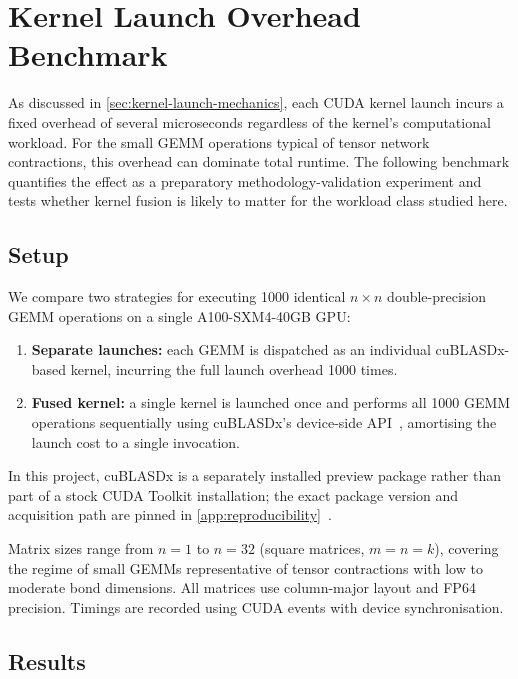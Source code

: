 \section{Kernel Launch Overhead Benchmark}\label{sec:launch-overhead-benchmark}

As discussed in \cref{sec:kernel-launch-mechanics}, each CUDA kernel launch
incurs a fixed overhead of several microseconds regardless of the kernel's
computational workload. For the small GEMM operations typical of tensor network
contractions, this overhead can dominate total runtime. The following benchmark
quantifies the effect as a preparatory methodology-validation experiment and
tests whether kernel fusion is likely to matter for the workload class studied
here.

\subsection{Setup}

We compare two strategies for executing 1000 identical $n \times n$
double-precision GEMM operations on a single A100-SXM4-40GB GPU:

\begin{enumerate}
  \item \textbf{Separate launches:} each GEMM is dispatched as an individual
    cuBLASDx-based kernel, incurring the full launch overhead 1000 times.
  \item \textbf{Fused kernel:} a single kernel is launched once and performs
    all 1000 GEMM operations sequentially using cuBLASDx's device-side
    API~\cite{cublasdx}, amortising the launch cost to a single invocation.
\end{enumerate}

In this project, cuBLASDx is a separately installed preview package rather than
part of a stock CUDA Toolkit installation; the exact package version and
acquisition path are pinned in \cref{app:reproducibility}~\cite{cublas,nvidia-cublasdx-downloads}.

Matrix sizes range from $n = 1$ to $n = 32$ (square matrices, $m = n = k$),
covering the regime of small GEMMs representative of tensor contractions with
low to moderate bond dimensions. All matrices use column-major layout and FP64
precision. Timings are recorded using CUDA events with device synchronisation.

\subsection{Results}


